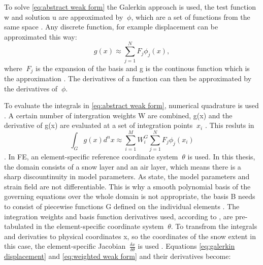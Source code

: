 \documentclass[10pt]{article}
\begin{document}
To solve \ref{eq:abstract weak form} the Galerkin approach is used, the test function w and solution u are approximated by $\ \phi$, which are a set of functions from the same space \parencite{afanasievModularFlexibleSpectralelement2019}. Any discrete function, for example displacement can be approximated this way: \begin{equation}
  g(x) \approx \sum_{j=1}^{N} F_j \phi_j(x), 
  \label{eq:galerkin displacement}
\end{equation} where $\ F_j$ is the expansion of the basis and g is the continous function which is the approximation \parencite{afanasievModularFlexibleSpectralelement2019}. The derivatives of a function can then be approximated by the derivatives of $\ \phi$. \par

To evaluate the integrals in \ref{eq:abstract weak form}, numerical quadrature is used \cite{afanasievModularFlexibleSpectralelement2019}. A certain number of intergration weights W are combined, g(x) and the derivative of g(x) are evaluated at a set of integration points $\ x_i$ \parencite{afanasievModularFlexibleSpectralelement2019}. This resluts in \begin{equation}
\int_G g(x)d^n x \approx \sum_{i=1}^{M}W_i^G \sum_{j=1}^{N}F_j\phi_j(x_i)
  \label{eq:weighted weak form}
\end{equation} \parencite{afanasievModularFlexibleSpectralelement2019}. In FE, an element-specific reference coordinate system $\ \theta$ is used. In this thesis, the domain consists of a snow layer and an air layer, which means there is a sharp discountinuity in model parameters. As \cite{afanasievModularFlexibleSpectralelement2019} state, the model parameters and strain field are not differentiable. This is why a smooth polynomial basis of the governing equations over the whole domain is not appropriate, the basis B needs to consist of piecewise functions G defined on the individual elements \parencite{afanasievModularFlexibleSpectralelement2019}. The integration weights and basis function derivatives used, according to \cite{afanasievModularFlexibleSpectralelement2019}, are pre-tabulated in the element-specific coordinate system $\ \theta$. To transfrom the integrals and derivaties to physical coordinates x, so the coordinates of the snow extent in this case, the element-specific Jacobian $\ \frac{\delta x}{\delta \theta}$ is used \parencite{afanasievModularFlexibleSpectralelement2019}. Equations \ref{eq:galerkin displacement} and \ref{eq:weighted weak form} and their derivatives become: \begin{equation}

\end{equation}
\end{document}
